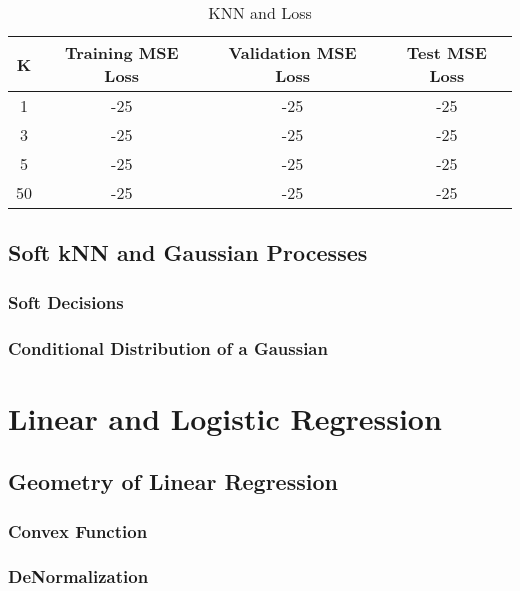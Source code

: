 \documentclass[a4paper,12pt]{article}
\begin{document}
\begin{table}[ht]
\centering %
\begin{tabular}{c c c c} %
\hline %
K & Training MSE Loss & Validation MSE Loss & Test MSE Loss \\ [0.5ex] 
\hline
1 & -25 & -25 & -25 \\ 
3 & -25 & -25 & -25 \\
5 & -25 & -25 & -25 \\
50 & -25 & -25 & -25 \\ [1ex] %
\hline %
\end{tabular}
\caption{KNN and Loss} %
\label{table:KLoss} %
\end{table}

\subsection{Soft kNN and Gaussian Processes}
\subsubsection{Soft Decisions}
\subsubsection{Conditional Distribution of a Gaussian}

\section{Linear and Logistic Regression}
\subsection{Geometry of Linear Regression}
\subsubsection{Convex Function}
\subsubsection{DeNormalization}
\end{document}
